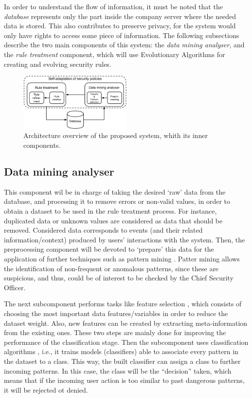 \documentclass{sig-alternate}
\begin{document}
In order to understand the flow of information, it must be noted that the \textit{database} represents only the part inside the company server where the needed data is stored. This also contributes to preserve privacy, for the system would only have rights to access some piece of information. The following subsections describe the two main components of this system: the \textit{data mining analyser}, and the \textit{rule treatment} component, which will use Evolutionary Algorithms for creating and evolving security rules.

\begin{figure}
  \begin{center}
    \includegraphics[width=0.5\textwidth]{./img/KRSgecco.png}
    \caption{Architecture overview of the proposed system, whith its inner components.}
    \label{fig:krs}
  \end{center}
\end{figure}

\subsection{Data mining analyser}
\label{subsec:datamining}

This component wil be in charge of taking the desired `raw' data from the database, and processing it to remove errors or non-valid values, in order to obtain a dataset to be used in the rule treatment process. For instance, duplicated data or unknown values are considered as data that should be removed. Considered data corresponds to events (and their related information/context) produced by users' interactions with the system.
Then, the preprocessing component will be devoted to `prepare' this data for the application of further techniques such as pattern mining \cite{han2007frequent}. Patter mining allows the identification of non-frequent or anomalous patterns, since these are suspicious, and thus, could be of interest to be checked by the Chief Security Officer.

The next subcomponent performs tasks like feature selection \cite{guyon2003introduction}, which consists of choosing the most important data features/variables in order to reduce the dataset weight. Also, new features can be created by extracting meta-information from the existing ones. These two steps are mainly done for improving the performance of the classification stage. Then the subcomponent uses classification algorithms \cite{witten2005data}, i.e., it trains models (classifiers) able to associate every pattern in the dataset to a class. This way, the built classifier can assign a class to further incoming patterns.  In this case, the class will be the ``decision'' taken, which means that if the incoming user action is too similar to past dangerous patterns, it will be rejected ot denied.
\end{document}
